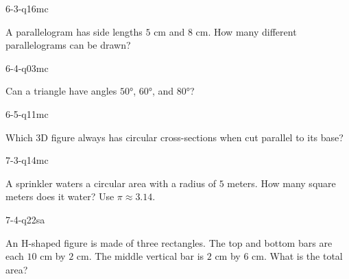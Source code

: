 \begin{practiceQuestion}{6-3-q16}{mc}
\begin{questionText}
A parallelogram has side lengths $5$ cm and $8$ cm. How many different parallelograms can be drawn?
\end{questionText}
\end{practiceQuestion}

\begin{practiceQuestion}{6-4-q03}{mc}
\begin{questionText}
Can a triangle have angles $50°$, $60°$, and $80°$?
\end{questionText}
\end{practiceQuestion}

\begin{practiceQuestion}{6-5-q11}{mc}
\begin{questionText}
Which 3D figure always has circular cross-sections when cut parallel to its base?
\end{questionText}
\end{practiceQuestion}

\begin{practiceQuestion}{7-3-q14}{mc}
\begin{questionText}
A sprinkler waters a circular area with a radius of $5$ meters. How many square meters does it water? Use $\pi \approx 3.14$.
\end{questionText}
\end{practiceQuestion}

\begin{practiceQuestion}{7-4-q22}{sa}
\begin{questionText}
An H-shaped figure is made of three rectangles. The top and bottom bars are each $10$ cm by $2$ cm. The middle vertical bar is $2$ cm by $6$ cm. What is the total area?
\end{questionText}
\end{practiceQuestion}

